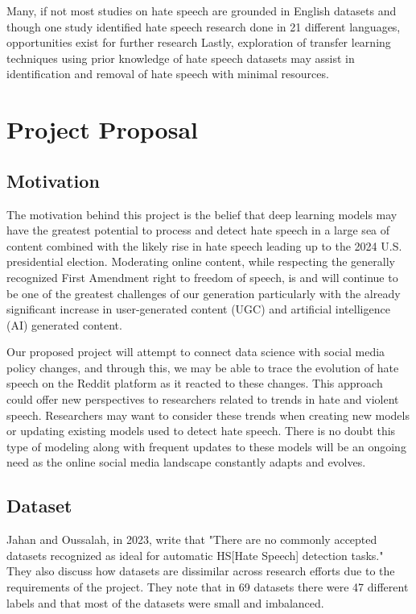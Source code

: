 \documentclass[conference]{IEEEtran}
\begin{document}
Many, if not most studies on hate speech are grounded in English datasets and though one study identified hate speech research done in 21 different languages, opportunities exist for further research\cite{b10} Lastly, exploration of transfer learning techniques using prior knowledge of hate speech datasets may assist in identification and removal of hate speech with minimal resources\cite{b17}.

\section{Project Proposal}

\subsection{Motivation}
The motivation behind this project is the belief that deep learning models may have the greatest potential to process and detect hate speech in a large sea of content combined with the likely rise in hate speech leading up to the 2024 U.S. presidential election. Moderating online content, while respecting the generally recognized First Amendment right to freedom of speech, is and will continue to be one of the greatest challenges of our generation particularly with the already significant increase in user-generated content (UGC) and artificial intelligence (AI) generated content. 

Our proposed project will attempt to connect data science with social media policy changes, and through this, we may be able to trace the evolution of hate speech on the Reddit platform as it reacted to these changes. This approach could offer new perspectives to researchers related to trends in hate and violent speech. Researchers may want to consider these trends when creating new models or updating existing models used to detect hate speech. There is no doubt this type of modeling along with frequent updates to these models will be an ongoing need as the online social media landscape constantly adapts and evolves. 

\subsection{Dataset}
Jahan and Oussalah, in 2023, write that "There are no commonly accepted datasets recognized as ideal for automatic HS[Hate Speech] detection tasks\cite{b10}." They also discuss how datasets are dissimilar across research efforts due to the requirements of the project. They note that in 69 datasets there were 47 different labels and that most of the datasets were small and imbalanced\cite{b10}.  
\end{document}
